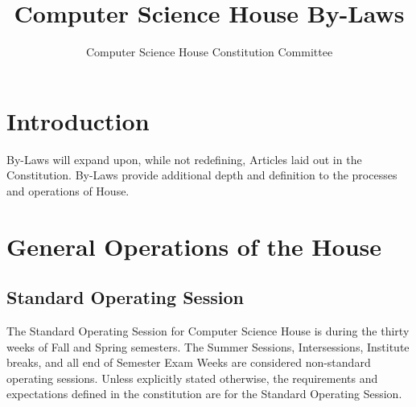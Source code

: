 \documentclass{article}
\title{Computer Science House By-Laws}
\author{Computer Science House Constitution Committee}
\date{\datechanged}
\newcommand{\bylaw}[1]{\section{#1} \label{#1}}
\newcommand{\bsection}[1]{\subsection{#1} \label{#1}}
\begin{document}
\maketitle

\bylaw{Introduction}
By-Laws will expand upon, while not redefining, Articles laid out in the Constitution. By-Laws provide additional depth and definition to the processes and operations of House.

\bylaw{General Operations of the House}
\bsection{Standard Operating Session}
The Standard Operating Session for Computer Science House is during the thirty weeks of Fall and Spring semesters. The Summer Sessions, Intersessions, Institute breaks, and all end of Semester Exam Weeks are considered non-standard operating sessions. Unless explicitly stated otherwise, the requirements and expectations deﬁned in the constitution are for the Standard Operating Session.
\end{document}
